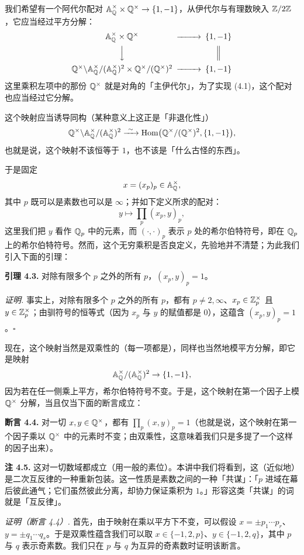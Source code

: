 我们希望有一个阿代尔配对 $\mathbb{A}^{\times}_{\mathbb{Q}}\times\mathbb{Q}^{\times}\to\{1,-1\}$，从伊代尔与有理数映入 $\mathbb{Z}/2\mathbb{Z}$，它应当经过平方分解：
\[
\begin{CD}
\mathbb{A}^{\times}_{\Q}\times\Q^{\times} @>>> \{1,-1\}\\
@VVV @| \\
\Q^{\times}\backslash \mathbb{A}^{\times}_{\Q}/(\mathbb{A}^{\times}_{\Q})^2\times \Q^{\times}/(\Q^{\times})^2 @>>> \{1,-1\}
\end{CD}
\]
这里乘积左项中的那份 $\mathbb{Q}^{\times}$ 就是对角的「主伊代尔」，为了实现 (4.1)，这个配对也应当经过它分解。

这个映射应当诱导同构（某种意义上这正是「非退化性」）
\[
\Q^{\times}\backslash \mathbb{A}^{\times}_{\Q}/(\mathbb{A}^{\times}_{\Q})^2 \xrightarrow{\ \sim\ } \operatorname{Hom}\bigl(\Q^{\times}/(\Q^{\times})^2,\{1,-1\}\bigr),
\]
也就是说，这个映射不该恒等于 $1$，也不该是「什么古怪的东西」。

于是固定
\[
x=(x_p)_p\in \mathbb{A}^{\times}_{\mathbb{Q}},
\]
其中 $p$ 既可以是素数也可以是 $\infty$；并如下定义所求的配对：
\[
y\mapsto \prod_p (x_p,y)_p,
\]
这里我们把 $y$ 看作 $\mathbb{Q}_p$ 中的元素，而 $(\cdot,\cdot)_p$ 表示 $p$ 处的希尔伯特符号，即在 $\mathbb{Q}_p$ 上的希尔伯特符号。然而，这个无穷乘积是否良定义，先验地并不清楚；为此我们引入下面的引理：

\textbf{引理 4.3.} 对除有限多个 $p$ 之外的所有 $p$，$(x_p,y)_p=1$。

\textit{证明.} 事实上，对除有限多个 $p$ 之外的所有 $p$，都有 $p\neq 2,\infty$、$x_p\in\mathbb{Z}^{\times}_p$ 且 $y\in\mathbb{Z}^{\times}_p$；由驯符号的恒等式（因为 $x_p$ 与 $y$ 的赋值都是 $0$），这蕴含 $(x_p,y)_p=1$。\hfill$\square$

现在，这个映射当然是双乘性的（每一项都是），同样也当然地模平方分解，即它是映射
\[
\mathbb{A}^{\times}_{\mathbb{Q}}/(\mathbb{A}^{\times}_{\mathbb{Q}})^2\to\{1,-1\},
\]
因为若在任一侧乘上平方，希尔伯特符号不变。于是，这个映射在第一个因子上模 $\mathbb{Q}^{\times}$ 分解，当且仅当下面的断言成立：

\textbf{断言 4.4.} 对一切 $x,y\in\mathbb{Q}^{\times}$，都有 $\prod_p (x,y)_p=1$（也就是说，这个映射在第一个因子乘以 $\mathbb{Q}^{\times}$ 中的元素时不变；由双乘性，这意味着我们只是多提了一个这样的因子出来）。

\textbf{注 4.5.} 这对一切数域都成立（用一般的素位）。本讲中我们将看到，这（近似地）是二次互反律的一种重新包装。这一性质是素数之间的一种「共谋」：「$p$ 进域在幕后彼此通气；它们虽然彼此分离，却协力保证乘积为 $1$。」形容这类「共谋」的词就是「互反律」。

\textit{证明（断言 4.4）.} 首先，由于映射在乘以平方下不变，可以假设 $x=\pm p_1\cdots p_r$、$y=\pm q_1\cdots q_s$。于是双乘性蕴含我们可以取 $x\in\{-1,2,p\}$、$y\in\{-1,2,q\}$，其中 $p$ 与 $q$ 表示奇素数。我们只在 $p$ 与 $q$ 为互异的奇素数时证明该断言。

